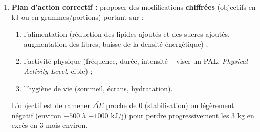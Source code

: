 \documentclass[11pt]{article}
\newcommand{\cle}[1]{{\popxbold\color{popdark}#1}}
\begin{document}
\begin{enumerate}
\begin{enumerate}
    \end{enumerate}
    \item \textbf{Plan d'action correctif :} proposer des modifications \textbf{chiffrées} (objectifs en kJ ou en grammes/portions) portant sur :
    \begin{enumerate}
        \item l'alimentation (réduction des lipides ajoutés et des sucres ajoutés, augmentation des fibres, baisse de la densité énergétique) ;
        \item l'activité physique (fréquence, durée, intensité -- viser un \cle{PAL}, \emph{Physical Activity Level}, cible) ;
        \item l'hygiène de vie (sommeil, écrans, hydratation).
    \end{enumerate}
    L'objectif est de ramener $\overline{\Delta E}$ proche de 0 (stabilisation) ou légèrement négatif (environ $-500$ à $-1000$ kJ/j) pour perdre progressivement les 3 kg en excès en 3 mois environ.
\end{enumerate}
\end{document}

